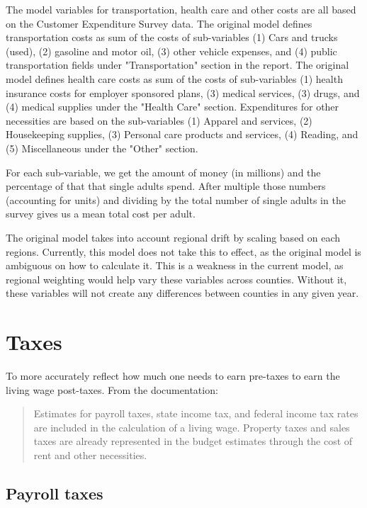 The model variables for transportation, health care and other costs are all based on the Customer Expenditure Survey data. The original model defines transportation costs as sum of the costs of sub-variables (1) Cars and trucks (used), (2) gasoline and motor oil, (3) other vehicle expenses, and (4) public transportation fields under "Transportation" section in the report.  The original model defines health care costs as sum of the costs of sub-variables (1) health insurance costs for employer sponsored plans, (3) medical services, (3) drugs, and (4) medical supplies under the "Health Care" section. Expenditures for other necessities are based on the sub-variables (1) Apparel and services, (2) Housekeeping supplies, (3) Personal care products and services, (4) Reading, and (5) Miscellaneous under the "Other" section.

For each sub-variable, we get the amount of money (in millions) and the percentage of that that single adults spend. After multiple those numbers (accounting for units) and dividing by the total number of single adults in the survey gives us a mean total cost per adult.

The original model takes into account regional drift by scaling based on each regions. Currently, this model does not take this to effect, as the original model is ambiguous on how to calculate it. This is a weakness in the current model, as regional weighting would help vary these variables across counties. Without it, these variables will not create any differences between counties in any given year.

\section{Taxes}

To more accurately reflect how much one needs to earn pre-taxes to earn the living wage post-taxes. From the documentation:

\begin{quote}
Estimates for payroll taxes, state income tax, and federal income tax rates are included in the calculation of a living wage. Property taxes and sales taxes are already represented in the budget estimates through the cost of rent and other necessities.
\end{quote}


\subsection{Payroll taxes}

